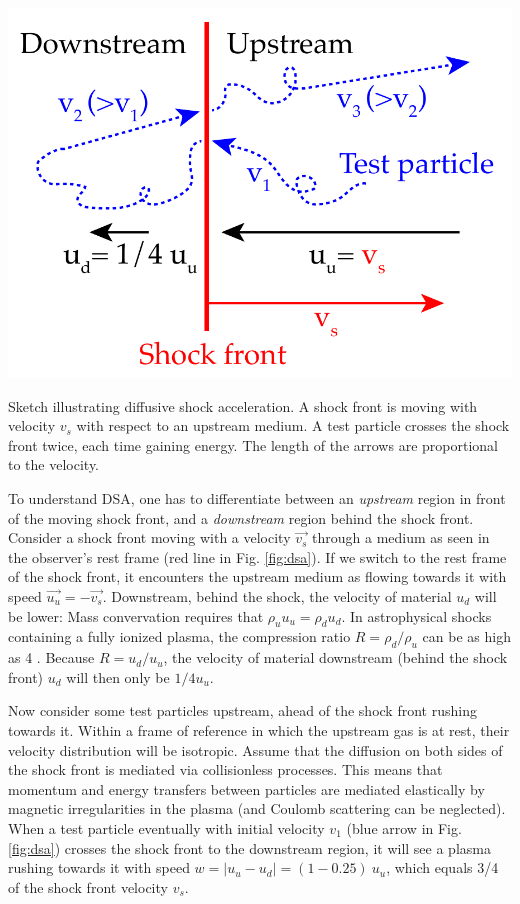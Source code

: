 \documentclass[
    a4paper, %
    fontsize=10pt, %
    twoside=false, %
    numbers=noenddot, %
    fontmethod=tex,
]{kaobook}
\begin{document}
\begin{marginfigure}
    \includegraphics{theory/dsa.pdf}
    \caption[Diffusive shock acceleration]{Sketch illustrating diffusive shock acceleration. A shock front is moving with velocity $v_s$ with respect to an upstream medium. A test particle crosses the shock front twice, each time gaining energy. The length of the arrows are proportional to the velocity.}
\end{marginfigure}

To understand DSA, one has to differentiate between an \textit{upstream} region in front of the moving shock front, and a \textit{downstream} region behind the shock front. Consider a shock front moving with a velocity $\vec{v_s}$ through a medium as seen in the observer's rest frame (red line in Fig. \ref{fig:dsa}). If we switch to the rest frame of the shock front, it encounters the upstream medium as flowing towards it with speed $\vec{u_u}=-\vec{v_s}$. Downstream, behind the shock, the velocity of material $u_d$ will be lower: Mass convervation requires that $\rho_u u_u = \rho_d u_d$. In astrophysical shocks containing a fully ionized plasma, the compression ratio $R=\rho_d/\rho_u$ can be as high as 4 . Because $R=u_d/u_u$, the velocity of material downstream (behind the shock front) $u_d$ will then only be $1/4 u_u$.

Now consider some test particles upstream, ahead of the shock front rushing towards it. Within a frame of reference in which the upstream gas is at rest, their velocity distribution will be isotropic. Assume that the diffusion on both sides of the shock front is mediated via collisionless processes. This means that momentum and energy transfers between particles are mediated elastically by magnetic irregularities in the plasma (and Coulomb scattering can be neglected). When a test particle eventually with initial velocity $v_1$ (blue arrow in Fig. \ref{fig:dsa}) crosses the shock front to the downstream region, it will see a plasma rushing towards it with speed $w=|u_u-u_d| = (1-0.25)~u_u$, which equals 3/4 of the shock front velocity $v_s$. 
\end{document}
